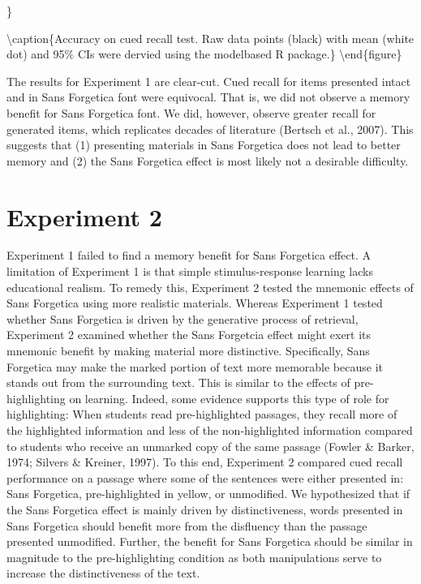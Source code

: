\documentclass[english,pdf]{apa6}
\begin{document}
\}

\textbackslash{}caption\{Accuracy on cued recall test. Raw data points (black) with mean (white dot) and 95\% CIs were dervied using the modelbased R package.\}\label{fig:unnamed-chunk-2}
\textbackslash{}end\{figure\}

The results for Experiment 1 are clear-cut. Cued recall for items presented intact and in Sans Forgetica font were equivocal. That is, we did not observe a memory benefit for Sans Forgetica font. We did, however, observe greater recall for generated items, which replicates decades of literature (Bertsch et al., 2007). This suggests that (1) presenting materials in Sans Forgetica does not lead to better memory and (2) the Sans Forgetica effect is most likely not a desirable difficulty.

\hypertarget{experiment-2}{%
\section{Experiment 2}\label{experiment-2}}

Experiment 1 failed to find a memory benefit for Sans Forgetica effect. A limitation of Experiment 1 is that simple stimulus-response learning lacks educational realism. To remedy this, Experiment 2 tested the mnemonic effects of Sans Forgetica using more realistic materials. Whereas Experiment 1 tested whether Sans Forgetica is driven by the generative process of retrieval, Experiment 2 examined whether the Sans Forgetcia effect might exert its mnemonic benefit by making material more distinctive. Specifically, Sans Forgetica may make the marked portion of text more memorable because it stands out from the surrounding text. This is similar to the effects of pre-highlighting on learning. Indeed, some evidence supports this type of role for highlighting: When students read pre-highlighted passages, they recall more of the highlighted information and less of the non-highlighted information compared to students who receive an unmarked copy of the same passage (Fowler \& Barker, 1974; Silvers \& Kreiner, 1997). To this end, Experiment 2 compared cued recall performance on a passage where some of the sentences were either presented in: Sans Forgetica, pre-highlighted in yellow, or unmodified. We hypothesized that if the Sans Forgetica effect is mainly driven by distinctiveness, words presented in Sans Forgetica should benefit more from the disfluency than the passage presented unmodified. Further, the benefit for Sans Forgetica should be similar in magnitude to the pre-highlighting condition as both manipulations serve to increase the distinctiveness of the text.
\end{document}
